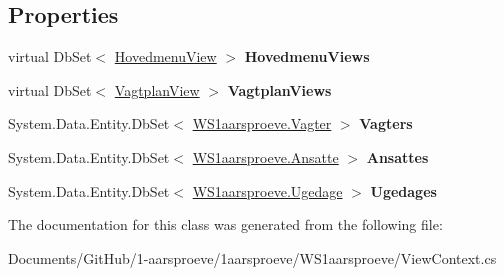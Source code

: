 \subsection*{Properties}
\begin{DoxyCompactItemize}
\item 
\hypertarget{class_w_s1aarsproeve_1_1_view_context_ace43c3024cef36b6cbe9fd9ec44100c8}{}virtual Db\+Set$<$ \hyperlink{class_w_s1aarsproeve_1_1_hovedmenu_view}{Hovedmenu\+View} $>$ {\bfseries Hovedmenu\+Views}\label{class_w_s1aarsproeve_1_1_view_context_ace43c3024cef36b6cbe9fd9ec44100c8}

\item 
\hypertarget{class_w_s1aarsproeve_1_1_view_context_aec88fe7b40a0a7a8fac94c016c86e93f}{}virtual Db\+Set$<$ \hyperlink{class_w_s1aarsproeve_1_1_vagtplan_view}{Vagtplan\+View} $>$ {\bfseries Vagtplan\+Views}\label{class_w_s1aarsproeve_1_1_view_context_aec88fe7b40a0a7a8fac94c016c86e93f}

\item 
\hypertarget{class_w_s1aarsproeve_1_1_view_context_aa1d28cfc20a4c42080e7aa92e6476cb4}{}System.\+Data.\+Entity.\+Db\+Set$<$ \hyperlink{class_w_s1aarsproeve_1_1_vagter}{W\+S1aarsproeve.\+Vagter} $>$ {\bfseries Vagters}\label{class_w_s1aarsproeve_1_1_view_context_aa1d28cfc20a4c42080e7aa92e6476cb4}

\item 
\hypertarget{class_w_s1aarsproeve_1_1_view_context_a580e3e2903c0ad40bed73ccebf63e0ae}{}System.\+Data.\+Entity.\+Db\+Set$<$ \hyperlink{class_w_s1aarsproeve_1_1_ansatte}{W\+S1aarsproeve.\+Ansatte} $>$ {\bfseries Ansattes}\label{class_w_s1aarsproeve_1_1_view_context_a580e3e2903c0ad40bed73ccebf63e0ae}

\item 
\hypertarget{class_w_s1aarsproeve_1_1_view_context_a133d475f83f0258f39c5ac185c66abee}{}System.\+Data.\+Entity.\+Db\+Set$<$ \hyperlink{class_w_s1aarsproeve_1_1_ugedage}{W\+S1aarsproeve.\+Ugedage} $>$ {\bfseries Ugedages}\label{class_w_s1aarsproeve_1_1_view_context_a133d475f83f0258f39c5ac185c66abee}

\end{DoxyCompactItemize}


The documentation for this class was generated from the following file\+:\begin{DoxyCompactItemize}
\item 
Documents/\+Git\+Hub/1-\/aarsproeve/1aarsproeve/\+W\+S1aarsproeve/View\+Context.\+cs\end{DoxyCompactItemize}
